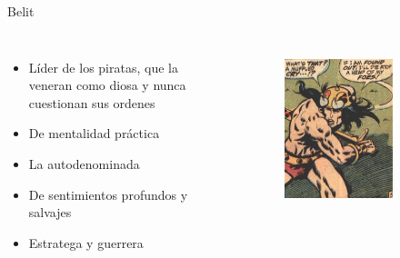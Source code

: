 \begin{frame}{Belit}
	\begin{columns}
		\begin{itemize}
			\item Líder de los piratas, que la veneran como diosa y nunca cuestionan sus ordenes
			\item De mentalidad práctica
			\item La autodenominada 
			\item De sentimientos profundos y salvajes
			\item Estratega y guerrera
		\end{itemize}
		\begin{figure}[htp]
			\centering
			\begin{subfigure}[b]{0.3\textwidth}
				\includegraphics[width=\textwidth]{img/conan/CTB}
			\end{subfigure}
			~
			\begin{subfigure}[b]{0.27\textwidth}

\end{subfigure}
\end{figure}
\end{columns}
\end{frame}
